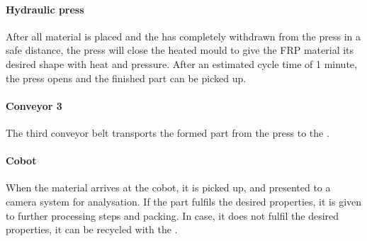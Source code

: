 
\paragraph{Hydraulic press} \label{sec:HydraulicPress}
After all material is placed and the  has completely withdrawn from the press in a safe distance, the press will close the heated mould to give the \ac{FRP} material its desired shape with heat and pressure. After an estimated cycle time of 1 minute, the press opens and the finished part can be picked up.


\paragraph{Conveyor 3}\label{sec:conveyor3}
The third conveyor belt transports the formed part from the press to the .

\paragraph{Cobot} \label{sec:Cobot}
When the material arrives at the cobot, it is picked up, and presented to a camera system for analysation. If the part fulfils the desired properties, it is given to further processing steps and packing.
In case, it does not fulfil the desired properties, it can be recycled with the .